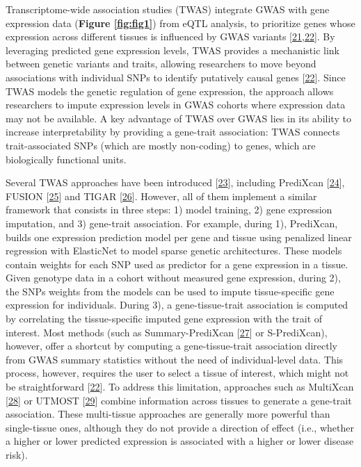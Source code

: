 Transcriptome-wide association studies (TWAS) integrate GWAS with gene expression data (\textbf{Figure \ref{fig:fig1}}) from eQTL analysis, to prioritize genes whose expression across different tissues is influenced by GWAS variants {[}\protect\hyperlink{ref-ReOPt75u}{21},\protect\hyperlink{ref-l6ogswV3}{22}{]}.
By leveraging predicted gene expression levels, TWAS provides a mechanistic link between genetic variants and traits, allowing researchers to move beyond associations with individual SNPs to identify putatively causal genes {[}\protect\hyperlink{ref-l6ogswV3}{22}{]}.
Since TWAS models the genetic regulation of gene expression, the approach allows researchers to impute expression levels in GWAS cohorts where expression data may not be available.
A key advantage of TWAS over GWAS lies in its ability to increase interpretability by providing a gene-trait association: TWAS connects trait-associated SNPs (which are mostly non-coding) to genes, which are biologically functional units.

Several TWAS approaches have been introduced {[}\protect\hyperlink{ref-RmhTH35O}{23}{]}, including PrediXcan {[}\protect\hyperlink{ref-Z8bvDdVq}{24}{]}, FUSION {[}\protect\hyperlink{ref-1D63fEEPb}{25}{]} and TIGAR {[}\protect\hyperlink{ref-19Klmizj8}{26}{]}.
However, all of them implement a similar framework that consists in three steps: 1) model training, 2) gene expression imputation, and 3) gene-trait association.
For example, during 1), PrediXcan, builds one expression prediction model per gene and tissue using penalized linear regression with ElasticNet to model sparse genetic architectures.
These models contain weights for each SNP used as predictor for a gene expression in a tissue.
Given genotype data in a cohort without measured gene expression, during 2), the SNPs weights from the models can be used to impute tissue-specific gene expression for individuals.
During 3), a gene-tissue-trait association is computed by correlating the tissue-specific imputed gene expression with the trait of interest.
Most methods (such as Summary-PrediXcan {[}\protect\hyperlink{ref-vLyTudUB}{27}{]} or S-PrediXcan), however, offer a shortcut by computing a gene-tissue-trait association directly from GWAS summary statistics without the need of individual-level data.
This process, however, requires the user to select a tissue of interest, which might not be straightforward {[}\protect\hyperlink{ref-l6ogswV3}{22}{]}.
To address this limitation, approaches such as MultiXcan {[}\protect\hyperlink{ref-1FFzCXo1s}{28}{]} or UTMOST {[}\protect\hyperlink{ref-93R9hBin}{29}{]} combine information across tissues to generate a gene-trait association.
These multi-tissue approaches are generally more powerful than single-tissue ones, although they do not provide a direction of effect (i.e., whether a higher or lower predicted expression is associated with a higher or lower disease risk).

